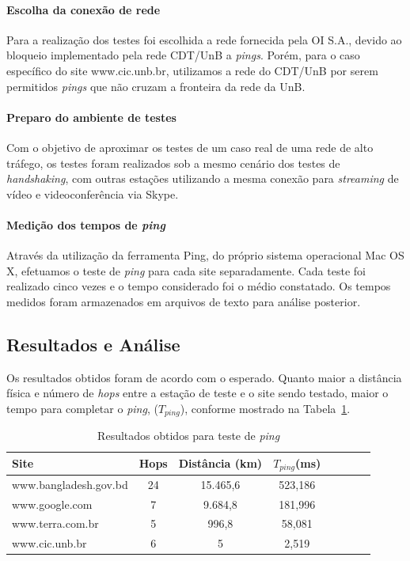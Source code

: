 \documentclass[12pt,a4paper]{report}
\begin{document}
\paragraph{Escolha da conexão de rede} Para a realização dos testes foi escolhida a rede fornecida pela OI S.A., devido ao bloqueio implementado pela rede CDT/UnB a \textit{pings}. Porém, para o caso específico do site www.cic.unb.br, utilizamos a rede do CDT/UnB por serem permitidos \textit{pings} que não cruzam a fronteira da rede da UnB.

\paragraph{Preparo do ambiente de testes} Com o objetivo de aproximar os testes de um caso real de uma rede de alto tráfego, os testes foram realizados sob a mesmo cenário dos testes de \textit{handshaking}, com outras estações utilizando a mesma conexão para \textit{streaming} de vídeo e videoconferência via Skype.

\paragraph{Medição dos tempos de \textit{ping}} Através da utilização da ferramenta Ping, do próprio sistema operacional Mac OS X, efetuamos o teste de \textit{ping} para cada site separadamente. Cada teste foi realizado cinco vezes e o tempo considerado foi o médio constatado. Os tempos medidos foram armazenados em arquivos de texto para análise posterior.

\subsection{Resultados e Análise}

Os resultados obtidos foram de acordo com o esperado. Quanto maior a distância física e número de \textit{hops} entre a estação de teste e o site sendo testado, maior o tempo para completar o \textit{ping}, (\(T_{ping}\)), conforme mostrado na Tabela~\ref{tab:resultsping}.

\begin{table}[h]
	\center
	\begin{tabular}{l*{6}{c}r}
	Site						& Hops	& Distância (km)	& \(T_{ping}\)(ms)\\
	\hline
	www.bangladesh.gov.bd		& 24		& 15.465,6		& 523,186\\
	www.google.com			& 7		& 9.684,8			& 181,996\\
	www.terra.com.br			& 5		& 996,8			& 58,081\\
	www.cic.unb.br				& 6		& 5				& 2,519\\
	\end{tabular}
	\caption{Resultados obtidos para teste de \textit{ping}}
	\label{tab:resultsping}
\end{table}
\end{document}
